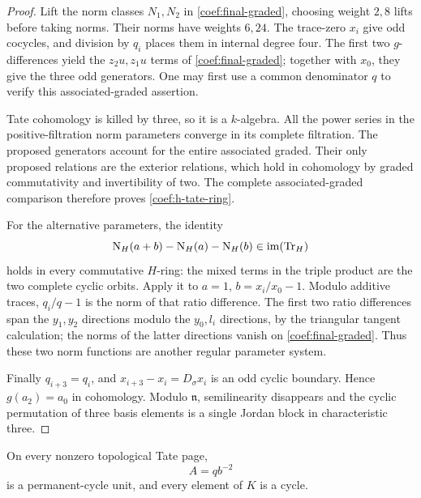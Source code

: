 \begin{proof}
Lift the norm classes \(N_1,N_2\) in \eqref{coef:final-graded}, choosing
weight \(2,8\) lifts before taking norms.  Their norms have weights
\(6,24\).  The trace-zero \(x_i\) give odd cocycles, and division by
\(q_i\) places them in internal degree four.  The first two
\(g\)-differences yield the \(z_2u,z_1u\) terms of
\eqref{coef:final-graded}; together with \(x_0\), they give the three
odd generators.  One may first use a common denominator \(q\) to
verify this associated-graded assertion.

Tate cohomology is killed by three, so it is a \(k\)-algebra.
All the power series in the positive-filtration norm parameters
converge in its complete filtration.  The proposed generators
account for the entire associated graded.  Their only proposed
relations are the exterior relations, which hold in cohomology by
graded commutativity and invertibility of two.  The complete
associated-graded comparison therefore proves
\eqref{coef:h-tate-ring}.

For the alternative parameters, the identity
\[
 \operatorname{N}_H(a+b)-\operatorname{N}_H(a)-\operatorname{N}_H(b)\in\operatorname{im}(\operatorname{Tr}_H)
\]
holds in every commutative \(H\)-ring: the mixed terms in the triple
product are the two complete cyclic orbits.  Apply it to
\(a=1\), \(b=x_i/x_0-1\).
Modulo additive traces, \(q_i/q-1\) is the norm of that ratio
difference.  The first two ratio differences span the \(y_1,y_2\)
directions modulo the \(y_0,l_i\) directions, by the triangular
tangent calculation; the norms of the latter directions vanish on
\eqref{coef:final-graded}.  Thus these two norm functions are another
regular parameter system.

Finally \(q_{i+3}=q_i\), and \(x_{i+3}-x_i=D_\sigma x_i\) is an odd
cyclic boundary.  Hence \(g(a_2)=a_0\) in cohomology.
Modulo \(\mathfrak n\), semilinearity disappears and the cyclic
permutation of three basis elements is a single Jordan block in
characteristic three.
\end{proof}

\begin{lemma}\label{coef:scalar-cycles}
On every nonzero topological Tate page,
\[
 A=qb^{-2}
\]
is a permanent-cycle unit, and every element of \(K\) is a cycle.
\end{lemma}

